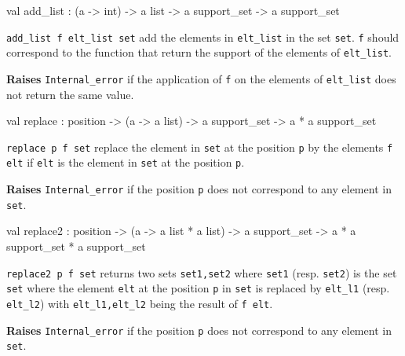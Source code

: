\label{val:Constraint.add-underscorelist}\begin{ocamldoccode}
val add_list : ({\textquotesingle}a -> int) ->
  {\textquotesingle}a list -> {\textquotesingle}a support_set -> {\textquotesingle}a support_set
\end{ocamldoccode}
\begin{ocamldocdescription}
{\tt{add\_list f elt\_list set}} add the elements in {\tt{elt\_list}} in the set {\tt{set}}. {\tt{f}} should correspond
    to the function that return the support of the elements of {\tt{elt\_list}}.

{\bf Raises} {\tt{Internal\_error}} if the application of {\tt{f}} on the elements of {\tt{elt\_list}} does not return the same value. \lowdebug 


\end{ocamldocdescription}




\label{val:Constraint.replace}\begin{ocamldoccode}
val replace :
  position ->
  ({\textquotesingle}a -> {\textquotesingle}a list) ->
  {\textquotesingle}a support_set -> {\textquotesingle}a * {\textquotesingle}a support_set
\end{ocamldoccode}
\begin{ocamldocdescription}
{\tt{replace p f set}} replace the element in {\tt{set}} at the position {\tt{p}} by the elements {\tt{f elt}}
    if {\tt{elt}} is the element in {\tt{set}} at the position {\tt{p}}.

{\bf Raises} {\tt{Internal\_error}} if the position {\tt{p}} does not correspond to any element in {\tt{set}}.


\end{ocamldocdescription}




\label{val:Constraint.replace2}\begin{ocamldoccode}
val replace2 :
  position ->
  ({\textquotesingle}a -> {\textquotesingle}a list * {\textquotesingle}a list) ->
  {\textquotesingle}a support_set ->
  {\textquotesingle}a * {\textquotesingle}a support_set * {\textquotesingle}a support_set
\end{ocamldoccode}
\begin{ocamldocdescription}
{\tt{replace2 p f set}} returns two sets {\tt{set1,set2}} where {\tt{set1}} (resp. {\tt{set2}}) is the set {\tt{set}} where 
    the element {\tt{elt}} at the position {\tt{p}} in {\tt{set}} is replaced by {\tt{elt\_l1}} (resp. {\tt{elt\_l2}}) with {\tt{elt\_l1,elt\_l2}}
    being the result of {\tt{f elt}}.

{\bf Raises} {\tt{Internal\_error}} if the position {\tt{p}} does not correspond to any element in {\tt{set}}.


\end{ocamldocdescription}




